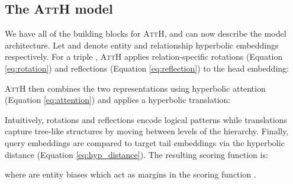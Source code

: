 \documentclass[11pt,a4paper]{article}
\newcommand{\model}[1]{\textsc{AttH}}
\begin{document}
 
\subsection{The \model{} model} \label{subsec:fullmodel}
We have all of the building blocks for \model{}, and can now describe the model architecture. 
Let  and  denote entity and relationship hyperbolic embeddings respectively. 
For a triple , \model{} applies relation-specific rotations (Equation \ref{eq:rotation}) and reflections (Equation \ref{eq:reflection}) to the head embedding: 

\model{} then combines the two representations using hyperbolic attention (Equation \ref{eq:attention}) and applies a hyperbolic translation:


Intuitively, rotations and reflections encode logical patterns while translations capture tree-like structures by moving between levels of the hierarchy. 
Finally, query embeddings are compared to target tail embeddings via the hyperbolic distance (Equation \ref{eq:hyp_distance}). 
The resulting scoring function is:

where  are entity biases which act as margins in the scoring function \cite{tifrea2018poincar,balavzevic2019multi}. 
\end{document}
